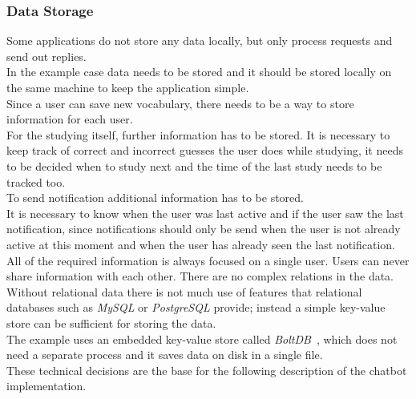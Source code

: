 \subsubsection{Data Storage}

Some applications do not store any data locally, but only process requests and send out replies.
\\
In the example case data needs to be stored and it should be stored locally on the same machine
to keep the application simple.
\\

Since a user can save new vocabulary,
there needs to be a way to store information for each user.
\\
For the studying itself, further information has to be stored.
It is necessary to keep track of correct and incorrect guesses the user does while studying, it needs to be decided when to study next and the time of the last study needs to be tracked too.
\\

To send notification additional information has to be stored.
\\
It is necessary to know when the user was last active and if the user saw the last notification,
since notifications should only be send when the user is not already active at this moment
and when the user has already seen the last notification.
\\

All of the required information is always focused on a single user.
Users can never share information with each other.
There are no complex relations in the data.
\\
Without relational data there is not much use of features that relational databases such as \emph{MySQL} or \emph{PostgreSQL} provide;
instead a simple key-value store can be sufficient for storing the data.
\\
The example uses an embedded key-value store called \emph{BoltDB}~\cite{boltdb}, which does not need a separate process and it saves data on disk in a single file.
\\


These technical decisions are the base for the following description of the chatbot implementation.
